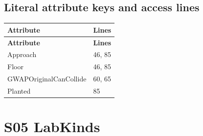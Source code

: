 \subsection{Literal attribute keys and access lines}
\begin{longtable}{p{}p{}}
\toprule
\textbf{Attribute} & \textbf{Lines} \\ \midrule
\endfirsthead
\textbf{Attribute} & \textbf{Lines} \\ \midrule
\endhead
Approach & 46, 85 \\
Floor & 46, 85 \\
GWAPOriginalCanCollide & 60, 65 \\
Planted & 85 \\
\bottomrule
\end{longtable}
\section{S05 LabKinds}
